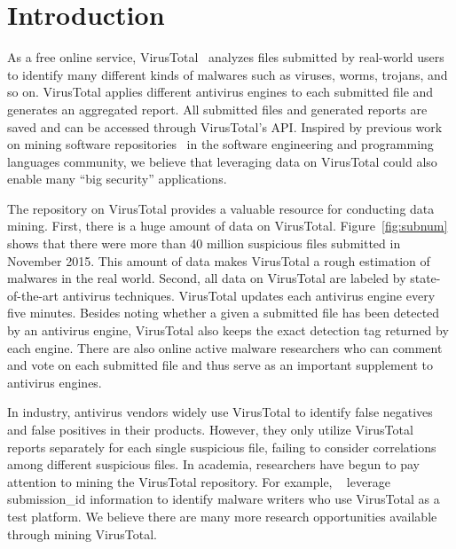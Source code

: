 \section{Introduction}

As a free online service, VirusTotal~\cite{virustotal} analyzes files submitted by real-world users to 
identify many different kinds of malwares such as viruses, worms, trojans, and so on. 
VirusTotal applies different antivirus engines to each submitted file and generates an aggregated report. 
All submitted files and generated reports are saved and can be accessed through VirusTotal's API. 
Inspired by previous work on mining software repositories~\cite{GuoICSE2010,bigcode, big-lessons,big-translation,code-completion,big-predicting} 
in the software engineering and programming languages community, 
we believe that leveraging data on VirusTotal could also enable many ``big security'' applications.   



The repository on VirusTotal provides a valuable resource for conducting data mining. 
First, there is a huge amount of data on VirusTotal.
Figure~\ref{fig:subnum} shows that there were more than 40 million suspicious files 
submitted in November 2015. 
This amount of data makes VirusTotal a rough estimation of malwares in the real world. 
Second, all data on VirusTotal are labeled by state-of-the-art antivirus techniques. 
VirusTotal updates each antivirus engine every five minutes. 
Besides noting whether a given a submitted file has been detected by an antivirus engine, 
VirusTotal also keeps the exact detection tag returned by each engine. 
There are also online active malware researchers 
who can comment and vote on each submitted file 
and thus serve as an important supplement to antivirus engines. 

In industry, antivirus vendors widely use VirusTotal to identify false negatives 
and false positives in their products. 
However, they only utilize VirusTotal reports separately for each single suspicious file, 
failing to consider correlations among different suspicious files. 
In academia, researchers have begun to pay attention to mining the VirusTotal repository. 
For example, ~\citet{neeles} leverage submission\_id information to identify malware writers 
who use VirusTotal as a test platform. 
We believe there are many more research opportunities available through mining VirusTotal. 

